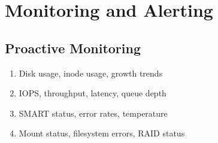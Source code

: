 \documentclass[letterpaper,10pt,english]{sphinxmanual}
\begin{document}
\section{Monitoring and Alerting}
\label{\detokenize{best-practices:monitoring-and-alerting}}

\subsection{Proactive Monitoring}
\label{\detokenize{best-practices:proactive-monitoring}}
\sphinxAtStartPar
{}
\begin{enumerate}
%
\item {} 
\sphinxAtStartPar
{} Disk usage, inode usage, growth trends

\item {} 
\sphinxAtStartPar
{} IOPS, throughput, latency, queue depth

\item {} 
\sphinxAtStartPar
{} SMART status, error rates, temperature

\item {} 
\sphinxAtStartPar
{} Mount status, filesystem errors, RAID status

\end{enumerate}

\sphinxAtStartPar
{}
\end{document}
